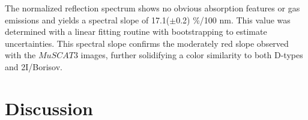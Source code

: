 \documentclass[twocolumn,longbib]{aastex7}
\begin{document}
\begin{CJK*}{UTF8}{gbsn}
The normalized reflection spectrum shows no obvious absorption features or gas emissions and yields a spectral slope of 17.1($\pm$0.2) \%/100 nm. This value was determined with a linear fitting routine with bootstrapping to estimate uncertainties. This spectral slope confirms the moderately red slope observed with the $MuSCAT3$ images, further solidifying a color similarity to both D-types and 2I/Borisov.

\section{Discussion}\label{sec:discussion}





\end{CJK*}
\end{document}
